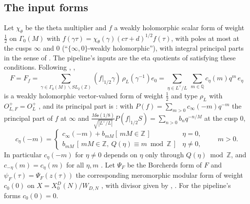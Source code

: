 \documentclass[11pt,reqno]{amsart}
\theoremstyle{plain}
\theoremstyle{definition}
\newcommand{\Q}{\mathbb{Q}}
\newcommand{\Z}{\mathbb{Z}}
\newcommand{\Ldual}{L^{\vee}}
\newcommand{\e}{\mathbf{e}}
\begin{document}
\subsection*{The input forms}
Let $\chi_\theta$ be the theta multiplier and $f$ a weakly holomorphic scalar form of weight
$\tfrac12$ on $\Gamma_0(M)$ with $f(\gamma\tau)=\chi_\theta(\gamma)(c\tau+d)^{1/2}f(\tau)$, with
poles at most at the cusps $\infty$ and $0$ (``$\{\infty,0\}$-weakly holomorphic''), with integral
principal parts in the sense of \cite[Lemma~25]{GY}. The pipeline's inputs are the eta quotients of
\cite[Lemma~13]{Yang} satisfying these conditions. Following \cite[(7)]{Yang}, \cite[(6)]{GY},
\[
  F=F_f=\sum_{\gamma\in\Gamma_0(M)\backslash SL_2(\Z)}(f|_{1/2}\gamma)\,\rho_L(\gamma^{-1})e_0
   =\sum_{\eta\in\Ldual/L}\ \sum_{m\in\Q}c_\eta(m)q^m\,e_\eta
\]
is a weakly holomorphic vector-valued form of weight $\tfrac12$ and type $\rho_L$ with
$O^+_{L,F}=O^+_L$ \cite[Lemmas~10, 12]{Yang}, and its principal part is \cite[Lemma~24]{GY}: with
$P(f)=\sum_{m>0}c_\infty(-m)q^{-m}$ the principal part of $f$ at $\infty$ and
$\frac{M\e(1/8)}{\sqrt{|\Ldual/L|}}P(f|_{1/2}S)=\sum_{n>0}b_nq^{-n/M}$ at the cusp $0$,
\begin{equation}\label{eq:GY24}
  c_\eta(-m)=\begin{cases}c_\infty(-m)+b_{mM}[\,mM\in\Z\,]&\eta=0,\\
  b_{mM}\,[\,mM\in\Z,\ Q(\eta)\equiv m\bmod\Z\,]&\eta\neq0,\end{cases}\qquad m>0 .
\end{equation}
In particular $c_\eta(-m)$ for $\eta\neq0$ depends on $\eta$ only through $Q(\eta)\bmod\Z$, and
$c_{-\eta}(m)=c_\eta(m)$ for all $\eta,m$ \cite[Thm.~13.3]{Borcherds}. Let $\Psi_F$ be the
Borcherds form of $F$ \cite[Thm.~A]{Yang} and $\psi_F(\tau)=\Psi_F(z(\tau))$ the corresponding
meromorphic modular form of weight $c_0(0)$ on $X=X_0^D(N)/W_{D,N}$ \cite[Lemma~6]{Yang}, with
divisor given by \cite[Lemma~7]{Yang}, \cite[Lemma~25]{GY}. For the pipeline's forms $c_0(0)=0$.
\end{document}
